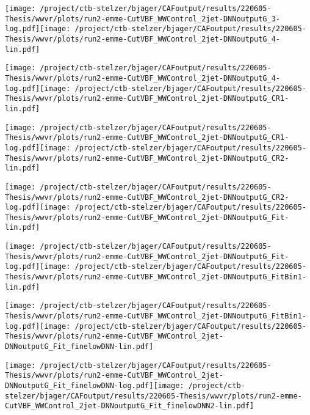 \documentclass{article}
\begin{document}
\texttt{[image: /project/ctb-stelzer/bjager/CAFoutput/results/220605-Thesis/wwvr/plots/run2-emme-CutVBF\_WWControl\_2jet-DNNoutputG\_3-log.pdf]}\texttt{[image: /project/ctb-stelzer/bjager/CAFoutput/results/220605-Thesis/wwvr/plots/run2-emme-CutVBF\_WWControl\_2jet-DNNoutputG\_4-lin.pdf]}

\texttt{[image: /project/ctb-stelzer/bjager/CAFoutput/results/220605-Thesis/wwvr/plots/run2-emme-CutVBF\_WWControl\_2jet-DNNoutputG\_4-log.pdf]}\texttt{[image: /project/ctb-stelzer/bjager/CAFoutput/results/220605-Thesis/wwvr/plots/run2-emme-CutVBF\_WWControl\_2jet-DNNoutputG\_CR1-lin.pdf]}

\texttt{[image: /project/ctb-stelzer/bjager/CAFoutput/results/220605-Thesis/wwvr/plots/run2-emme-CutVBF\_WWControl\_2jet-DNNoutputG\_CR1-log.pdf]}\texttt{[image: /project/ctb-stelzer/bjager/CAFoutput/results/220605-Thesis/wwvr/plots/run2-emme-CutVBF\_WWControl\_2jet-DNNoutputG\_CR2-lin.pdf]}

\texttt{[image: /project/ctb-stelzer/bjager/CAFoutput/results/220605-Thesis/wwvr/plots/run2-emme-CutVBF\_WWControl\_2jet-DNNoutputG\_CR2-log.pdf]}\texttt{[image: /project/ctb-stelzer/bjager/CAFoutput/results/220605-Thesis/wwvr/plots/run2-emme-CutVBF\_WWControl\_2jet-DNNoutputG\_Fit-lin.pdf]}

\texttt{[image: /project/ctb-stelzer/bjager/CAFoutput/results/220605-Thesis/wwvr/plots/run2-emme-CutVBF\_WWControl\_2jet-DNNoutputG\_Fit-log.pdf]}\texttt{[image: /project/ctb-stelzer/bjager/CAFoutput/results/220605-Thesis/wwvr/plots/run2-emme-CutVBF\_WWControl\_2jet-DNNoutputG\_FitBin1-lin.pdf]}

\texttt{[image: /project/ctb-stelzer/bjager/CAFoutput/results/220605-Thesis/wwvr/plots/run2-emme-CutVBF\_WWControl\_2jet-DNNoutputG\_FitBin1-log.pdf]}\texttt{[image: /project/ctb-stelzer/bjager/CAFoutput/results/220605-Thesis/wwvr/plots/run2-emme-CutVBF\_WWControl\_2jet-DNNoutputG\_Fit\_finelowDNN-lin.pdf]}

\texttt{[image: /project/ctb-stelzer/bjager/CAFoutput/results/220605-Thesis/wwvr/plots/run2-emme-CutVBF\_WWControl\_2jet-DNNoutputG\_Fit\_finelowDNN-log.pdf]}\texttt{[image: /project/ctb-stelzer/bjager/CAFoutput/results/220605-Thesis/wwvr/plots/run2-emme-CutVBF\_WWControl\_2jet-DNNoutputG\_Fit\_finelowDNN2-lin.pdf]}
\end{document}
